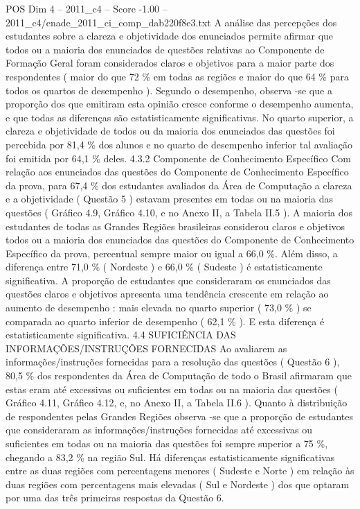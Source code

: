 \begin{textsample}{POS Dim 4 – 2011\_c4 – Score -1.00 – 2011\_c4/enade\_2011\_ci\_comp\_dab220f8e3.txt}
A análise das percepções dos estudantes sobre a clareza e objetividade dos enunciados permite afirmar que todos ou a maioria dos enunciados de questões relativas ao Componente de Formação Geral foram considerados claros e objetivos para a maior parte dos respondentes ( maior do que 72 \% em todas as regiões e maior do que 64 \% para todos os quartos de desempenho ).
Segundo o desempenho, observa -se que a proporção dos que emitiram esta opinião cresce conforme o desempenho aumenta, e que todas as diferenças são estatisticamente significativas.
No quarto superior, a clareza e objetividade de todos ou da maioria dos enunciados das questões foi percebida por 81,4 \% dos alunos e no quarto de desempenho inferior tal avaliação foi emitida por 64,1 \% deles. 4.3.2 Componente de Conhecimento Específico Com relação aos enunciados das questões do Componente de Conhecimento Específico da prova, para 67,4 \% dos estudantes avaliados da Área de Computação a clareza e a objetividade ( Questão 5 ) estavam presentes em todas ou na maioria das questões ( Gráfico 4.9, Gráfico 4.10, e no Anexo II, a Tabela II.5 ).
A maioria dos estudantes de todas as Grandes Regiões brasileiras considerou claros e objetivos todos ou a maioria dos enunciados das questões do Componente de Conhecimento Específico da prova, percentual sempre maior ou igual a 66,0 \%.
Além disso, a diferença entre 71,0 \% ( Nordeste ) e 66,0 \% ( Sudeste ) é estatisticamente significativa.
A proporção de estudantes que consideraram os enunciados das questões claros e objetivos apresenta uma tendência crescente em relação ao aumento de desempenho : mais elevada no quarto superior ( 73,0 \% ) se comparada ao quarto inferior de desempenho ( 62,1 \% ).
E esta diferença é estatisticamente significativa. 4.4 SUFICIÊNCIA DAS INFORMAÇÕES/INSTRUÇÕES FORNECIDAS Ao avaliarem as informações/instruções fornecidas para a resolução das questões ( Questão 6 ), 80,5 \% dos respondentes da Área de Computação de todo o Brasil afirmaram que estas eram até excessivas ou suficientes em todas ou na maioria das questões ( Gráfico 4.11, Gráfico 4.12, e, no Anexo II, a Tabela II.6 ).
Quanto à distribuição de respondentes pelas Grandes Regiões observa -se que a proporção de estudantes que consideraram as informações/instruções fornecidas até excessivas ou suficientes em todas ou na maioria das questões foi sempre superior a 75 \%, chegando a 83,2 \% na região Sul.
Há diferenças estatisticamente significativas entre as duas regiões com percentagens menores ( Sudeste e Norte ) em relação às duas regiões com percentagens mais elevadas ( Sul e Nordeste ) dos que optaram por uma das três primeiras respostas da Questão 6.

\end{textsample}
